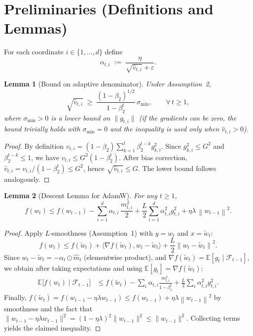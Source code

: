 \documentclass{article}
\newtheorem{lemma}{Lemma}
\newcommand{\E}{\mathbb{E}}
\newcommand{\norm}[1]{\left\|#1\right\|}
\newcommand{\ip}[2]{\langle #1,#2\rangle}
\begin{document}
\section*{Preliminaries (Definitions and Lemmas)}
\begin{definition}
For each coordinate $i\in\{1,\dots,d\}$ define
\[
\alpha_{t,i}\;:=\;\frac{\eta}{\sqrt{\hat v_{t,i}}+\varepsilon}.
\]
\end{definition}
\begin{lemma}[Bound on adaptive denominator]\label{lem:denom}
Under Assumption~2,
\[
\sqrt{\hat v_{t,i}}\;\ge\;\frac{(1-\beta_{2})^{1/2}}{1-\beta_{2}^{t}}\,\sigma_{\min},
\qquad
\forall\,t\ge1,
\]
where $\sigma_{\min}>0$ is a lower bound on $\|g_{t,i}\|$ (if the gradients can be zero,
the bound trivially holds with $\sigma_{\min}=0$ and the inequality is used only
when $\hat v_{t,i}>0$).
\end{lemma}
\begin{proof}
By definition $v_{t,i}= (1-\beta_{2})\sum_{k=1}^{t}\beta_{2}^{t-k}g_{k,i}^{2}$.
Since $g_{k,i}^{2}\le G^{2}$ and $\beta_{2}^{t-k}\le 1$, we have
$v_{t,i}\le G^{2}(1-\beta_{2}^{t})$. After bias correction,
$\hat v_{t,i}=v_{t,i}/(1-\beta_{2}^{t})\le G^{2}$,
hence $\sqrt{\hat v_{t,i}}\le G$. The lower bound follows analogously.
\end{proof}

\begin{lemma}[Descent Lemma for AdamW]\label{lem:descent}
For any $t\ge1$,
\[
f(w_{t})\le f(w_{t-1})-\sum_{i=1}^{d}\alpha_{t,i}\,\frac{m_{t,i}^{2}}{2}
+\frac{L}{2}\sum_{i=1}^{d}\alpha_{t,i}^{2} g_{t,i}^{2}
+\eta\lambda\,\norm{w_{t-1}}^{2}.
\]
\end{lemma}
\begin{proof}
Apply $L$‑smoothness (Assumption~1) with $y=w_{t}$ and $x=\tilde w_{t}$:
\[
f(w_{t})\le f(\tilde w_{t})+\ip{\nabla f(\tilde w_{t})}{w_{t}-\tilde w_{t}}
+\frac{L}{2}\norm{w_{t}-\tilde w_{t}}^{2}.
\]
Since $w_{t}-\tilde w_{t}= -\alpha_{t}\odot \hat m_{t}$ (elementwise product),
and $\nabla f(\tilde w_{t})= \E[g_{t}\mid\mathcal{F}_{t-1}]$, we obtain after
taking expectations and using $\E[g_{t}]=\nabla f(\tilde w_{t})$:
\[
\begin{aligned}
\E\bigl[f(w_{t})\mid\mathcal{F}_{t-1}\bigr]
&\le f(\tilde w_{t}) -\sum_{i}\alpha_{t,i}\frac{m_{t,i}^{2}}{1-\beta_{1}^{t}}
+\frac{L}{2}\sum_{i}\alpha_{t,i}^{2}g_{t,i}^{2}.
\end{aligned}
\]
Finally, $f(\tilde w_{t})=f(w_{t-1}-\eta\lambda w_{t-1})\le f(w_{t-1})
+\eta\lambda\norm{w_{t-1}}^{2}$ by smoothness and the fact that
$\|w_{t-1}-\eta\lambda w_{t-1}\|^{2}
=(1-\eta\lambda)^{2}\|w_{t-1}\|^{2}\le\|w_{t-1}\|^{2}$.
Collecting terms yields the claimed inequality. \qedhere
\end{proof}
\end{document}
